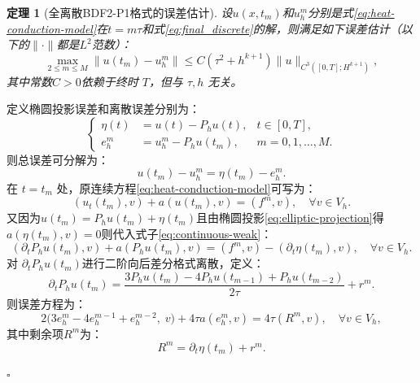 \documentclass{GZUbachelorthesis}
\makeatletter
\renewcommand{\proofname}{证明}
\renewenvironment{proof}[1][\proofname]{\par
	\normalfont
	\topsep6\p@\@plus6\p@\relax
	\trivlist
	\setlength{\itemindent}{2em}%
	\item[\hskip\labelsep{\songti #1：}]\ignorespaces
}{\hfill\ensuremath{\square}\endtrivlist\@endpefalse}
\theoremstyle{chineseplain}
\newtheorem{theorem}{定理}[section]
\makeatother
\begin{document}
\begin{theorem}[全离散BDF2-P1格式的误差估计]\label{thm:quanwuc}
设$u(x,t_m)$和$u_h^m$分别是式\eqref{eq:heat-conduction-model}在$t=m\tau$和式\eqref{eq:final_discrete}的解，则满足如下误差估计（以下的$\|\cdot\|$都是$L^2$范数）：
\begin{equation}\label{eq:error-estimate}
	\max_{2 \leq m \leq M} \|u(t_m) - u_h^m\| \leq C (\tau^2 + h^{k+1}) \|u\|_{C^3([0,T];H^{k+1})},
\end{equation}
其中常数$C > 0$依赖于终时 $T$，但与 $\tau, h$ 无关。
\end{theorem}
\begin{proof}
定义椭圆投影误差和离散误差分别为：
\[
	\left\{
\begin{aligned}
	\eta(t) &= u(t) - P_h u(t), & t \in [0,T], \\
	e_h^m &= u_h^m - P_h u(t_m), & m = 0,1,\dots,M.
\end{aligned}
\right.
\]
则总误差可分解为：
\begin{equation}\label{eq:error-decomposition}
	u(t_m) - u_h^m = \eta(t_m) - e_h^m.
\end{equation}
在 $t = t_m$ 处，原连续方程\eqref{eq:heat-conduction-model}可写为：
\begin{equation}\label{eq:continuous-weak}	
	(u_t(t_m), v) + a(u(t_m),  v) = (f^m, v), \quad \forall v \in V_h.
\end{equation}
又因为$u(t_m)=P_h u(t_m)+\eta(t_m)$且由椭圆投影\eqref{eq:elliptic-projection}得$a(\eta(t_m),v)=0$则代入式子\eqref{eq:continuous-weak}：
\begin{equation}\label{eq:projection-weak}
	(\partial_{t} P_h u(t_m),v)+a(P_h u(t_m),v)=(f^m, v)-(\partial_{t} \eta(t_m),v), \quad \forall v \in V_h.
\end{equation}
对 $\partial_{t} P_h u(t_m)$进行二阶向后差分格式离散，定义：
\[
\partial_{t} P_h u(t_m)=\frac{3P_h u(t_m) - 4P_h u(t_{m-1}) + P_h u(t_{m-2})}{2\tau}+r^m.
\]
则误差方程为：
\begin{equation}\label{eq:error-equation}
	2\bigl( 3e_h^m - 4e_h^{m-1} + e_h^{m-2},\; v \bigr) + 4\tau a( e_h^m,  v) = 4\tau (R^m, v), \quad \forall v \in V_h,
\end{equation}
其中剩余项$R^m$为：
\begin{equation}\label{eq:R-def}
	R^m=\partial_{t} \eta(t_m)+ r^m.
\end{equation}


\end{proof}
\end{document}
